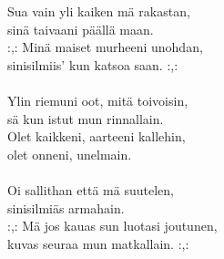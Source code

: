 
        Sua vain yli kaiken mä rakastan, \\
        sinä taivaani päällä maan. \\
        :,: Minä maiset murheeni unohdan, \\
        sinisilmiis' kun katsoa saan. :,: \\
\hspace{10mm} \\
        Ylin riemuni oot, mitä toivoisin, \\
        sä kun istut mun rinnallain. \\
        Olet kaikkeni, aarteeni kallehin, \\
        olet onneni, unelmain. \\
\hspace{10mm} \\
        Oi sallithan että mä suutelen, \\
        sinisilmiäs armahain. \\
        :,: Mä jos kauas sun luotasi joutunen, \\
        kuvas seuraa mun matkallain. :,: \\
